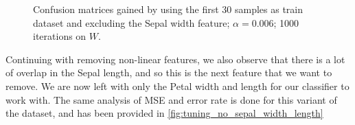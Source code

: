 \documentclass{article}
\begin{document}
\begin{figure}
    \centering
    \qquad
    \caption{Confusion matrices gained by using the first 30 samples as train dataset%
    and excluding the Sepal width feature;%
    $\alpha = 0.006$; 1000 iterations on $W$.}\label{fig:CM_no_sepal_width}
\end{figure}

Continuing with removing non-linear features, we also observe that there is a lot of overlap
in the Sepal length, and so this is the next feature that we want to remove. We are now left
with only the Petal width and length for our classifier to work with. The same analysis of
MSE and error rate is done for this variant of the dataset, and has been provided in
\autoref{fig:tuning_no_sepal_width_length}
\end{document}
